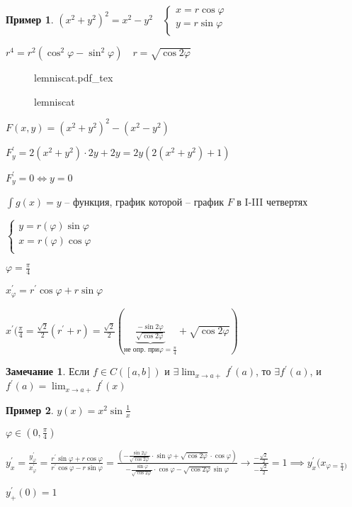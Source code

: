 \documentclass{book}
\newcommand{\p}[1]{#1^{\prime}}
\theoremstyle{definition}
\newtheorem*{note}{Замечание}
\newtheorem*{example}{Пример}
\newcommand{\incfig}[1]{%
    \def\svgwidth{\columnwidth}
    {#1.pdf_tex}
}
\begin{document}
\begin{example}
    $\left( x^2+y^2 \right) ^2 = x^2-y^2\quad \begin{cases}
        x = r\cos\varphi\\
        y = r\sin\varphi\\
    \end{cases}$ 

    $r^4 = r^2\left( \cos ^2\varphi - \sin^2 \varphi \right) \quad r = \sqrt{\cos 2\varphi} $

\begin{figure}[!ht]
    \centering
    \incfig{lemniscat}
    \caption{lemniscat}
    \label{fig:lemniscat}
\end{figure}

$F(x,y) = \left( x^2+y^2 \right) ^2-(x^2-y^2)$

$\p F_y = 2\left( x^2+y^2 \right)\cdot 2y + 2y = 2y\left( 2(x^2+y^2)+1 \right)  $ 

$\p F_y = 0 \iff y = 0$

$\int g(x) = y$ -- функция, график которой -- график  $F$ в I-III четвертях

 $\begin{cases}
     y = r(\varphi)\sin \varphi\\
     x = r\left( \varphi \right) \cos \varphi\\
 \end{cases}$ 

 $\varphi = \frac{\pi}{4} $ 

 $\p x_{\varphi} = \p r\cos \varphi + r\sin \varphi$

 $\p x(\frac{\pi}{4} = \frac{\sqrt{2} }{2}\left( \p r + r \right) = \frac{\sqrt{2} }{2}\left( \underbrace{\frac{-\sin 2\varphi}{\sqrt{\cos 2\varphi} }}_{\text{не опр. при} \varphi=\frac{\pi}{4} } + \sqrt{\cos 2\varphi}  \right)  $
\end{example}

\begin{note}
    Если $f\in C\left( [a,b] \right) $ и $\exists \lim_{x \to a+} \p f(a)$, то $\exists \p f(a)$, и $\p f(a) = \lim_{x \to a+} \p f(x)$
\end{note}

\begin{example}
    $y(x) = x^2\sin \frac{1}{x}$ 

    $\varphi\in \left( 0, \frac{\pi}{4} \right) $

    $\p y_x = \frac{\p y_{\varphi}}{\p x_{\varphi}} = \frac{\p r\sin \varphi + r\cos \varphi}{\p r\cos \varphi - r\sin \varphi}= \frac{\left( -\frac{\sin 2\varphi}{\sqrt{\cos 2\varphi} }\cdot \sin \varphi + \sqrt{\cos 2\varphi}\cdot \cos \varphi  \right) }{-\frac{\sin \varphi}{\sqrt{\cos 2\varphi}} \cdot \cos \varphi - \sqrt{\cos 2\varphi} \sin \varphi} \to \frac{-\frac{\sqrt{2} }{2}}{-\frac{\sqrt{2} }{2}} = 1\implies \p y_x(x_{\varphi = \frac{\pi}{4}) }$ 

    $\p y_{+}(0) = 1$
\end{example}
\end{document}
